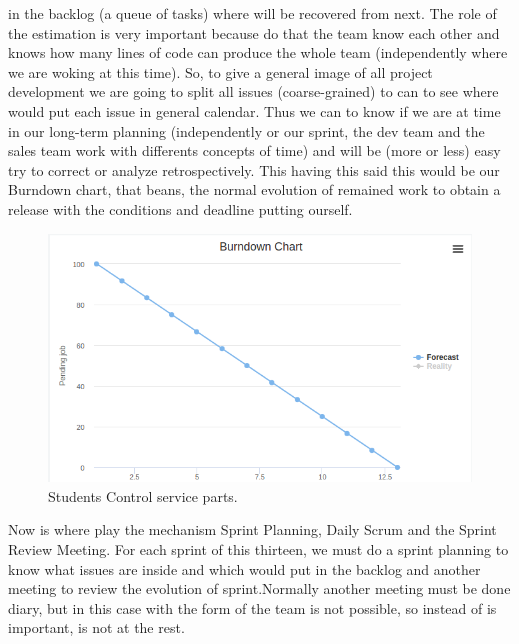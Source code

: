 in the backlog (a queue of tasks) where will be recovered from next.
The role of the estimation is very important because do that the team know each
other and knows how many lines of code can produce the whole team (independently
where we are woking at this time).
\intro
So, to give a general image of all project development we are going to split all
issues (coarse-grained) to can to see where would put each issue in general calendar.
Thus we can to know if we are at time in our long-term planning (independently or
our sprint, the dev team and the sales team work with differents concepts of time)
and will be (more or less) easy try to correct or analyze retrospectively.
\intro
This having this said this would be our Burndown chart, that beans, the normal
evolution of remained work to obtain a release with the conditions and deadline
putting ourself.

\begin{figure}[H]
  \includegraphics[scale=0.4]{img/graphics/burndown.png}
  \centering
  \caption{Students Control service parts.}
\end{figure}

\noindent Now is where play the mechanism Sprint Planning, Daily Scrum and the Sprint
Review Meeting. For each sprint of this thirteen, we must do a sprint planning
to know what issues are inside and which would put in the backlog and another
meeting to review the evolution of sprint.Normally another meeting must be done
diary, but in this case with the form of the team is not possible, so instead of is important, is not at the rest.
